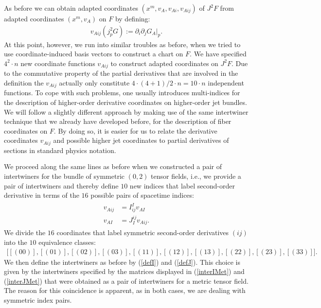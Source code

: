 As before we can obtain adapted coordinates $(x^m, v_A, v_{Ai},v_{Aij})$ of $J^2F$ from adapted coordinates $(x^m,v_A)$ on $F$ by defining:
\begin{align}
    v_{Aij}(j^2_pG) := \partial_i \partial_j G_A \big \vert _p.
\end{align} 
At this point, however, we run into similar troubles as before, when we tried to use coordinate-induced basis vectors to construct a chart on $F$. 
We have specified $4^2\cdot n$ new coordinate functions $v_{Aij}$ to construct adapted coordinates on $J^2F$. Due to the commutative property of the partial derivatives that are involved in the definition the $v_{Aij}$ actually only constitute $4\cdot (4+1)/2 \cdot n = 10\cdot n$ independent functions. To cope with such problems, one usually introduces multi-indices for the description of higher-order derivative coordinates on higher-order jet bundles. We will follow a slightly different approach by making use of the same intertwiner technique that we already have developed before, for the description of fiber coordinates on $F$. By doing so, it is easier for us to relate the derivative coordinates $v_{Aij}$ and possible higher jet coordinates to partial derivatives of sections in standard physics notation. 

We proceed along the same lines as before when we constructed a pair of intertwiners for the bundle of symmetric $(0,2)$ tensor fields, i.e., we provide a pair of intertwiners and thereby define $10$ new indices that label second-order derivative in terms of the $16$ possible pairs of spacetime indices:
\begin{align}
    \begin{aligned}
    v_{Aij} &= I^I_{ij} v_{AI}\\
    v_{AI} &= J_I^{ij} v_{Aij}.
    \end{aligned}
\end{align}
We divide the $16$ coordinates that label symmetric second-order derivatives $(ij)$ into the $10$ equivalence classes: 
\begin{align}
    \bigl [[(00)],[(01)],[(02)],[(03)],[(11)],[(12)],[(13)],[(22)],[(23)],[(33)] \bigr ].
\end{align}
We then define the intertwiners as before by (\ref{defI}) and (\ref{defJ}). 
This choice is given by the intertwiners specified by the matrices displayed in (\ref{interIMet}) and (\ref{interJMet}) that were obtained as a pair of intertwiners for a metric tensor field. The reason for this coincidence is apparent, as in both cases, we are dealing with symmetric index pairs. 


